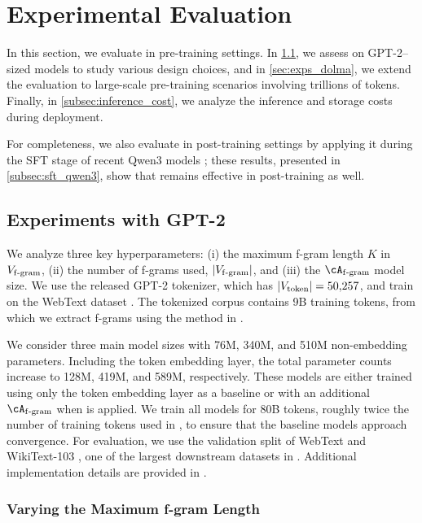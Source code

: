 
\section{Experimental Evaluation}\label{sec:exps_openwebtext}

In this section, we evaluate \SCONE in pre-training settings. In \cref{subsec:exp_gpt}, we assess \SCONE on GPT-2–sized models to study various design choices, and in \cref{sec:exps_dolma}, we extend the evaluation to large-scale pre-training scenarios involving trillions of tokens. Finally, in \cref{subsec:inference_cost}, we analyze the inference and storage costs during deployment.

For completeness, we also evaluate \SCONE in post-training settings by applying it during the SFT stage of recent Qwen3 models \citep{yang2025qwen3}; these results, presented in \cref{subsec:sft_qwen3}, show that \SCONE remains effective in post-training as well.


\subsection{Experiments with GPT-2}
\label{subsec:exp_gpt}

We analyze three key hyperparameters: (i) the maximum f-gram length $K$ in $V_{\mathrm{f\text{-}gram}}$, (ii) the number of f-grams used, $|V_{\mathrm{f\text{-}gram}}|$, and (iii) the $\Afgram$ model size. We use the released GPT-2 tokenizer, which has $|V_{\mathrm{token}}| = 50,\!257$, and train on the WebText dataset \citep{openwebtext}. The tokenized corpus  contains 9B training tokens, from which we extract f-grams using the method in .

We consider three main model sizes with 76M, 340M, and 510M non-embedding parameters. Including the token embedding layer, the total parameter counts increase to 128M, 419M, and 589M, respectively. These models are either trained using only the token embedding layer as a baseline or with an additional $\Afgram$ when \SCONE is applied. We train all models for 80B tokens, roughly twice the number of training tokens used in \citet{radford2018improving}, to ensure that the baseline models approach convergence. For evaluation, we use the validation split of WebText and WikiText-103 \citep{merity2016pointer}, one of the largest downstream datasets in \citet{radford2019language}. Additional implementation details are provided in .

\subsubsection{Varying the Maximum f-gram Length}\label{subsec:max_ngram_size}


